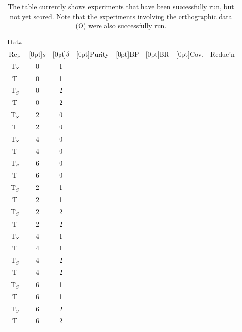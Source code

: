 \begin{table}[htb]
\begin{center}
\small
\setlength{\extrarowheight}{12pt}
\begin{tabular}{c|cc|ccc |rc}
Data  &  & & &  &  & &  \\ 
  Rep        & \raisebox{1.5ex}[0pt]{$s$} & \raisebox{1.5ex}[0pt]{$\delta$} & \raisebox{1.5ex}[0pt]{Purity} 
  & \raisebox{1.5ex}[0pt]{BP} & \raisebox{1.5ex}[0pt]{BR}                        & \raisebox{1.5ex}[0pt]{Cov.} & Reduc'n \\

\hline
$\text{T}_{S}$ & 0 & 1 & & & & & \\
\rowcolor{LightGray}
$\text{T}$        & 0 & 1 & & & & & \\

$\text{T}_S$   & 0 & 2 & & & & & \\
\rowcolor{LightGray}
$\text{T}$       & 0 & 2 & & & & & \\
$\text{T}_S$         & 2 & 0 & & & & & \\
\rowcolor{LightGray}
$\text{T}$         & 2 & 0 & & & & &  \\

$\text{T}_S$         & 4 & 0 & & & & &  \\
\rowcolor{LightGray}
$\text{T}$         & 4 & 0 & & & & & \\

$\text{T}_{S}$ & 6 & 0 & & & & & \\
\rowcolor{LightGray}
$\text{T}$ & 6 & 0 & & & & & \\
$\text{T}_S$        & 2 & 1 & & & & & \\ 
\rowcolor{LightGray}
$\text{T}$ & 2 & 1 & & & & & \\ 
$\text{T}_S$        & 2 & 2 & & & & & \\ 
\rowcolor{LightGray}
$\text{T}$ & 2 & 2 & & & & & \\ 
$\text{T}_S$        & 4 & 1 & & & & & \\ 
\rowcolor{LightGray}
$\text{T}$ & 4 & 1 & & & & & \\ 
$\text{T}_S$        & 4 & 2 &  & & &  & \\
\rowcolor{LightGray} 
$\text{T}$        & 4 & 2 & & & & & \\
$\text{T}_{S}$ & 6 & 1 & & & & & \\ 
\rowcolor{LightGray}
$\text{T}$        & 6 & 1 & & & & & \\ 
$\text{T}_{S}$ & 6 & 2 & & & & & \\ 
\rowcolor{LightGray}
$\text{T}$        & 6 & 2 & & & & & \\ 
\end{tabular}
\end{center}
\caption{The table currently shows experiments that have been successfully run, but not
yet scored. Note that the experiments involving the orthographic data (O) were also successfully run.}
\label{tab:results}
\end{table}

